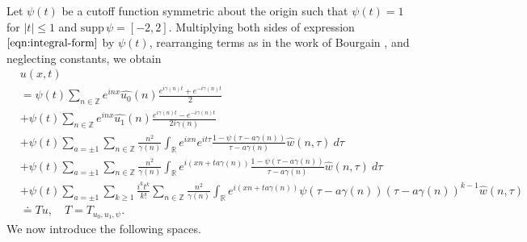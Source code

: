 \documentclass[12pt,reqno]{amsart}
\numberwithin{equation}{section}  %
\renewcommand{\cref}{\Cref}
\newcommand{\rr}{\mathbb{R}}
\newcommand{\zz}{\mathbb{Z}}
\newcommand{\wh}{\widehat}
\begin{document}
%
%
Let $\psi(t)$ be a cutoff function symmetric about the 
origin such that $\psi(t) = 1$ for $|t| \le 1$ and $\text{supp} \, \psi 
= [-2, 2 ]$.
Multiplying both sides of expression
$\cref{eqn:integral-form}$ by $\psi(t)$, rearranging terms as in the work of Bourgain \cite{Bourgain:1993ju}, and neglecting constants, we obtain
%
%
%
%
%
\begin{align}
  & u(x,t)
  \label{main1-rel-term-0}
  \\
  \label{main1-rel-term-1}
  & = \psi(t) \sum_{n \in \zz} e^{inx} \wh{u_{0}}(n) \frac{e^{i\gamma(n)t} + e^{-i\gamma(n)t}}{2} 
  \\
  \label{main1-rel-term-2}
  & + \psi(t) \sum_{n \in \zz} e^{inx}
  \wh{u_{1}}(n)\frac{e^{i\gamma(n)t} - e^{-i\gamma(n)t}}{2 i \gamma(n)} 
  \\
  \label{main1-rel-term-3}
  & +  \psi(t)\sum_{a = \pm 1} \sum_{n\in \zz} \frac{n^{2}}{\gamma(n)}\int_\rr e^{ixn}  
  e^{it \tau} \frac{1 - \psi(\tau -  a\gamma(n)) 
}{\tau -  a\gamma(n)} \wh{w}(n, \tau) \ d \tau
  \\
  \label{main1-rel-term-4}
  & + \psi(t) \sum_{a = \pm 1} \sum_{n\in \zz} \frac{n^{2}}{\gamma(n)}\int_\rr e^{i(xn + 
  t a\gamma(n))}
  \frac{1- \psi(\tau -  a\gamma(n))}{\tau -  a\gamma(n)} \wh{w}(n, \tau) \ d \tau
  \\
  \label{main1-rel-term-4.5}
  & +  \psi(t) \sum_{a = \pm 1}  \sum_{k \ge 1} \frac{i^k t^k}{k!}
  \sum_{n \in \zz} \frac{n^{2}}{\gamma(n)}\int_\rr e^{i(xn + t a\gamma(n) )}
  \psi(\tau -  a\gamma(n)) (\tau -  a\gamma(n))^{k-1} \wh{w}(n, \tau)
  \\
  \label{main1-rel-term-5}
  & \doteq Tu, \quad T=T_{u_0, u_1, \psi}.
\end{align}
%
%
%
%
%
%
%
%
%
%
%
%
We now introduce the following spaces. 
%
%
\end{document}
